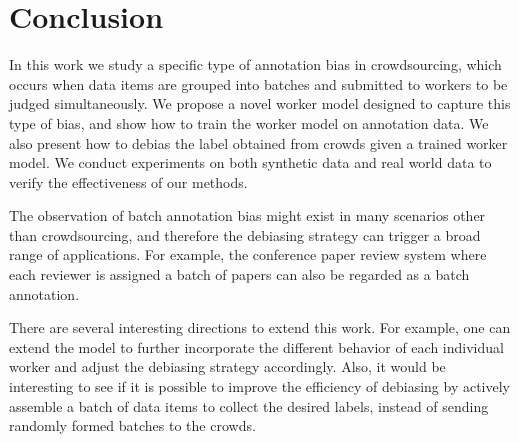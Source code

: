 \section{Conclusion}
\label{sec:conclusion}

In this work we study a specific type of annotation bias in crowdsourcing, 
which occurs when data items are grouped into batches 
and submitted to workers to be judged simultaneously.  
We propose a novel worker model designed to capture this type of bias, 
and show how to train the worker model on annotation data.  
We also present how to debias the label obtained from crowds given a trained worker model.  
We conduct experiments on both synthetic data and real world data to verify the effectiveness of our methods.  

The observation of batch annotation bias might exist in many scenarios other than crowdsourcing, 
and therefore the debiasing strategy can trigger a broad range of applications. 
For example, the conference paper review system where each reviewer is assigned a batch of papers 
can also be regarded as a batch annotation.  

There are several interesting directions to extend this work.  
For example, one can extend the model to further incorporate the different behavior of each individual worker  
and adjust the debiasing strategy accordingly.  
Also, it would be interesting to see if it is possible to improve the efficiency of debiasing 
by actively assemble a batch of data items to collect the desired labels, 
instead of sending randomly formed batches to the crowds.  


